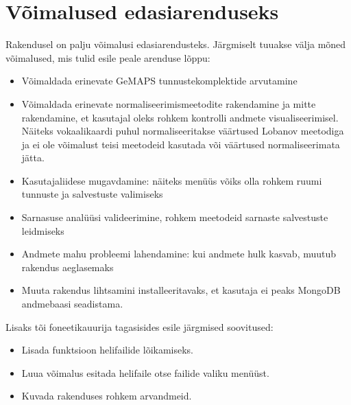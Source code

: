 \section{Võimalused edasiarenduseks}
Rakendusel on palju võimalusi edasiarendusteks. Järgmiselt tuuakse välja mõned võimalused, mis tulid esile peale arenduse lõppu:
\begin{itemize}
    \item Võimaldada erinevate GeMAPS tunnustekomplektide arvutamine
    \item Võimaldada erinevate normaliseerimismeetodite rakendamine ja mitte rakendamine, et kasutajal oleks rohkem kontrolli andmete visualiseerimisel. Näiteks vokaalikaardi puhul normaliseeritakse väärtused Lobanov meetodiga ja ei ole võimalust teisi meetodeid kasutada või väärtused normaliseerimata jätta.
    \item Kasutajaliidese mugavdamine: näiteks menüüs võiks olla rohkem ruumi tunnuste ja salvestuste valimiseks
    \item Sarnasuse analüüsi valideerimine, rohkem meetodeid sarnaste salvestuste leidmiseks
    \item Andmete mahu probleemi lahendamine: kui andmete hulk kasvab, muutub rakendus aeglasemaks
    \item Muuta rakendus lihtsamini installeeritavaks, et kasutaja ei peaks MongoDB andmebaasi seadistama.
\end{itemize}

Lisaks tõi foneetikauurija tagasisides esile järgmised soovitused:
\begin{itemize}
    \item Lisada funktsioon helifailide lõikamiseks.
    \item Luua võimalus esitada helifaile otse failide valiku menüüst.
    \item Kuvada rakenduses rohkem arvandmeid.
\end{itemize}
